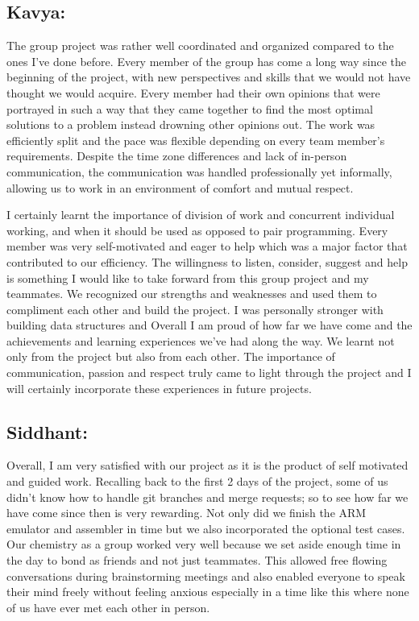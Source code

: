 \documentclass[a4paper]{article}
\begin{document}
\subsection{Kavya:}
The group project was rather well coordinated and organized compared to the ones I've done before. Every member of the group has come a long way since the beginning of the project, with new perspectives and skills that we would not have thought we would acquire. Every member had their own opinions that were portrayed in such a way that they came together to find the most optimal solutions to a problem instead drowning other opinions out. The work was efficiently split and the pace was flexible depending on every team member's requirements. Despite the time zone differences and lack of in-person communication, the communication was handled professionally yet informally, allowing us to work in an environment of comfort and mutual respect.

I certainly learnt the importance of division of work and concurrent individual working, and when it should be used as opposed to pair programming. Every member was very self-motivated and eager to help which was a major factor that contributed to our efficiency. The willingness to listen, consider, suggest and help is something I would like to take forward from this group project and my teammates.  We recognized our strengths and weaknesses and used them to compliment each other and build the project. I was personally stronger with building data structures and Overall I am proud of how far we have come and the achievements and learning experiences we've had along the way. We learnt not only from the project but also from each other. The importance of communication, passion and respect truly came to light through the project and I will certainly incorporate these experiences in future projects.

\subsection{Siddhant:}
Overall, I am very satisfied with our project as it is the product of self motivated and guided work. Recalling back to the first 2 days of the project, some of us didn't know how to handle git branches and merge requests; so to see how far we have come since then is very rewarding. Not only did we finish the ARM emulator and assembler in time but we also incorporated the optional test cases. Our chemistry as a group worked very well because we set aside enough time in the day to bond as friends and not just teammates. This allowed free flowing conversations during brainstorming meetings and also enabled everyone to speak their mind freely without feeling anxious especially in a time like this where none of us have ever met each other in person.
\end{document}

